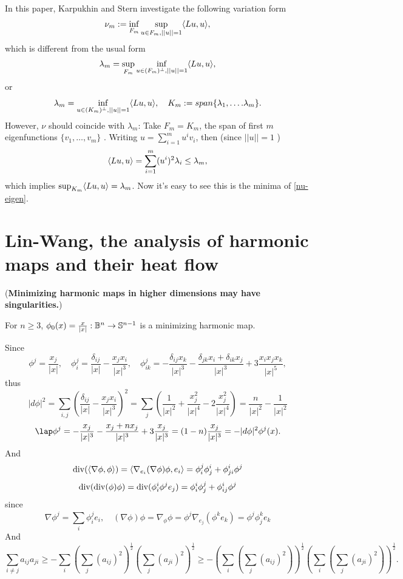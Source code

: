 \documentclass[a4paper,12pt]{article}
\begin{document}
In this paper, Karpukhin and Stern investigate
the following variation form
\begin{equation}\label{nu-eigen}
    \nu _m:= \inf_{F_m} \sup_{u \in F_m,||u||=1}\la Lu, u \ra ,
\end{equation}
which is different from the usual form 
\begin{equation}
    \lambda _m= \sup_{F_m} \inf_{u \in (F_m)^{\perp },||u||=1}\la Lu, u \ra ,
\end{equation}
or 
\begin{equation}
    \lambda _m= \inf_{u \in (K_m)^{\perp },||u||=1}\la Lu, u \ra , \quad K_m:=span\{\lambda _1,\dots.\lambda _m\}.
\end{equation}
However, $\nu $ should coincide with $\lambda _m$: Take $F_m=K_m$, the span of first $m$ eigenfunctions $\{v_1,\dots,v_m\}$ . Writing $u=\sum_{i=1}^{m} u^i v_i$, then (since $||u||=1$ )
$$ \la Lu,u  \ra= \sum_{i=1}^{m} (u^i)^2 \lambda _i \leq \lambda _m,$$     
which implies $\sup_{K_m}\la Lu,u  \ra=\lambda _m$. Now it's easy to see this is the minima of 
\eqref{nu-eigen}.



\section{Lin-Wang, the analysis of harmonic maps and their heat flow}

\np (\textbf{Minimizing harmonic maps in higher dimensions may have singularities.})
\begin{proposition}
    For $n \geq 3$, $\phi _0(x)=\frac{x}{|x|}:\mathbb{B}^n \to \ss^{n-1}$ is a minimizing harmonic map.  
\end{proposition}
Since
$$ \phi^j=\frac{x_j}{|x|} , \quad \phi ^j_i = \frac{\delta _{ij}}{|x|}-\frac{x_j x_i}{|x|^3},\quad \phi ^j_{ik}=-\frac{\delta _{ij}x_k}{|x|^3}-\frac{\delta_{jk}x_i+\delta _{ik}x_j}{|x|^3}+3\frac{x_i x_j x_k}{|x|^5}, $$
thus
$$ |d \phi |^2 =\sum_{i,j}^{}(\frac{\delta _{ij}}{|x|}-\frac{x_j x_i}{|x|^3})^2=\sum_{j}^{}(\frac{1}{|x|^2}+\frac{x_j^2}{|x|^4}-2\frac{x_j^2}{|x|^4})=\frac{n}{|x|^2}-\frac{1}{|x|^2}$$
$$ \lap \phi ^j=-\frac{x_j}{|x|^3}-\frac{x_j+nx_j}{|x|^3} + 3 \frac{x_j}{|x|^3}=(1-n)\frac{x_j}{|x|^3}=-|d \phi |^2 \phi^j (x).$$
And
$$ \di(\la \nabla \phi ,\phi   \ra)=\la \nabla_{e_i} (\nabla \phi )\phi, e_i \ra =\phi _{i}^j \phi _{j}^i+\phi _{ji}^i \phi ^j$$
$$ \di(\di(\phi )\phi )=\di(\phi _i^i \phi ^j e_j) =\phi _i^i \phi ^j_j+\phi _{ij}^i \phi ^j$$
since 
$$ \nabla \phi ^j= \sum_{i}^{}\phi ^j_i e_i, \quad (\nabla \phi )\phi =\nabla _{\phi }\phi  =\phi ^j \nabla _{e_j} (\phi ^k e_{k})=\phi ^j \phi _j^k e_k$$
And
$$\sum_{i \neq j}^{} a_{ij}a_{ji} \geq -\sum_{i}^{}(\sum_{j}^{}(a_{ij})^2)^{\frac{1}{2}}(\sum_{j}^{}(a_{ji})^2)^{\frac{1}{2}}
\geq -\left(\sum_{i}^{}(\sum_{j}^{}(a_{ij})^2)\right)^{\frac{1}{2}}\left(\sum_{i}(\sum_{j}^{}(a_{ji})^2)\right)^{\frac{1}{2}}.$$
\end{document}
